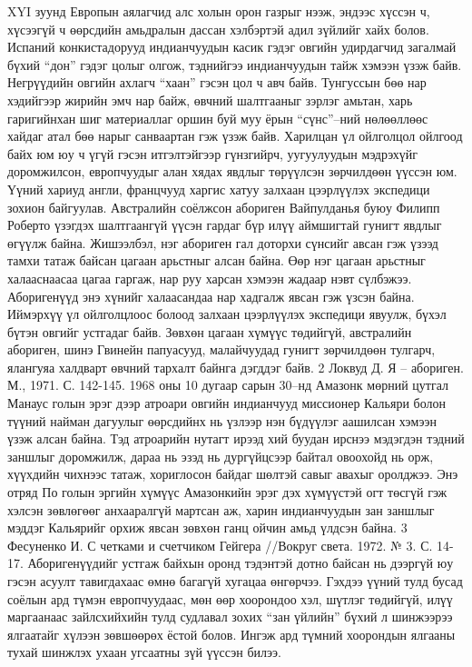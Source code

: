 XYI зуунд Европын аялагчид алс холын орон газрыг нээж, эндээс хүссэн ч, хүсээгүй ч өөрсдийн амьдралын дассан хэлбэртэй адил зүйлийг хайх болов. Испаний конкистадорууд индианчуудын касик гэдэг овгийн удирдагчид загалмай бүхий “дон” гэдэг цолыг олгож, тэднийгээ индианчуудын тайж хэмээн үзэж байв. Негрүүдийн овгийн ахлагч “хаан” гэсэн цол ч авч байв. Тунгуссын бөө нар хэдийгээр жирийн эмч нар байж, өвчний шалтгааныг зэрлэг амьтан, харь гаригийнхан шиг материаллаг оршин буй муу ёрын “сүнс”–ний нөлөөллөөс хайдаг атал бөө нарыг санваартан гэж үзэж байв.
Харилцан үл ойлголцол ойлгоод байх юм юу ч үгүй гэсэн итгэлтэйгээр гүнзгийрч, уугуулуудын мэдрэхүйг доромжилсон, европчуудыг алан хядах явдлыг төрүүлсэн зөрчилдөөн үүссэн юм. Үүний хариуд англи, францчууд харгис хатуу залхаан цээрлүүлэх экспедици зохион байгуулав.
Австралийн соёлжсон абориген Вайпулданья буюу Филипп Роберто үзэгдэх шалтгаангүй үүсэн гардаг бүр илүү аймшигтай гунигт явдлыг өгүүлж байна. Жишээлбэл, нэг абориген гал доторхи сүнсийг авсан гэж үзээд тамхи татаж байсан цагаан арьстныг алсан байна. Өөр нэг цагаан арьстныг халааснаасаа цагаа гаргаж, нар руу харсан хэмээн жадаар нэвт сүлбэжээ. Аборигенүүд энэ хүнийг халаасандаа нар хадгалж явсан гэж үзсэн байна. Иймэрхүү үл ойлголцлоос болоод залхаан цээрлүүлэх экспедици явуулж, бүхэл бүтэн овгийг устгадаг байв. Зөвхөн цагаан хүмүүс төдийгүй, австралийн абориген, шинэ Гвинейн папуасууд, малайчуудад гунигт зөрчилдөөн тулгарч, ялангуяа халдварт өвчний тархалт байнга дэгддэг байв.
2 Локвуд Д. Я – абориген. М., 1971. С. 142-145.
1968 оны 10 дугаар сарын 30–нд Амазонк мөрний цутгал Манаус голын эрэг дээр атроари овгийн индианчууд миссионер Кальяри болон түүний найман дагуулыг өөрсдийнх нь үзлээр нэн бүдүүлэг аашилсан хэмээн үзэж алсан байна. Тэд атроарийн нутагт ирээд хий буудан ирснээ мэдэгдэн тэдний заншлыг доромжилж, дараа нь эзэд нь дургүйцсээр байтал овоохойд нь орж, хүүхдийн чихнээс татаж, хориглосон байдаг шөлтэй савыг авахыг оролджээ. Энэ отряд По голын эргийн хүмүүс Амазонкийн эрэг дэх хүмүүстэй огт төсгүй гэж хэлсэн зөвлөгөөг анхааралгүй мартсан аж, харин индианчуудын зан заншлыг мэддэг Кальярийг орхиж явсан зөвхөн ганц ойчин амьд үлдсэн байна.
3 Фесуненко И. С четками и счетчиком Гейгера //Вокруг света. 1972. № 3. С. 14-17.
Аборигенүүдийг устгаж байхын оронд тэдэнтэй дотно байсан нь дээргүй юу гэсэн асуулт тавигдахаас өмнө багагүй хугацаа өнгөрчээ. Гэхдээ үүний тулд бусад соёлын ард түмэн европчуудаас, мөн өөр хоорондоо хэл, шүтлэг төдийгүй, илүү маргаанаас зайлсхийхийн тулд судлавал зохих “зан үйлийн” бүхий л шинжээрээ ялгаатайг хүлээн зөвшөөрөх ёстой болов. Ингэж ард түмний хоорондын ялгааны тухай шинжлэх ухаан угсаатны зүй үүссэн билээ.
